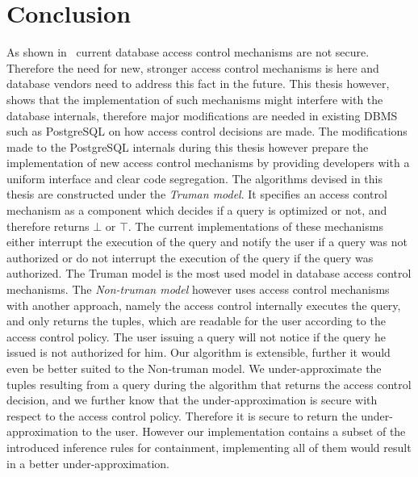 \section{Conclusion}

As shown in~\cite{guarnieri2016strong} current database access control mechanisms are not secure.
%
Therefore the need for new, stronger access control mechanisms is here and database vendors need to address this fact in the future.
%
This thesis however, shows that the implementation of such mechanisms might interfere with the database internals, therefore major modifications are needed in existing DBMS such as PostgreSQL on how access control decisions are made.
%
The modifications made to the PostgreSQL internals during this thesis however prepare the implementation of new access control mechanisms by providing developers with a uniform interface and clear code segregation.
%
The algorithms devised in this thesis are constructed under the \emph{Truman model}.
%
It specifies an access control mechanism as a component which decides if a query is optimized or not, and therefore returns $\bot$ or $\top$.
%
The current implementations of these mechanisms either interrupt the execution of the query and notify the user if a query was not authorized or do not interrupt the execution of the query if the query was authorized.
%
The Truman model is the most used model in database access control mechanisms.
%
The \emph{Non-truman model} however uses access control mechanisms with another approach, namely the access control internally executes the query, and only returns the tuples, which are readable for the user according to the access control policy.
%
The user issuing a query will not notice if the query he issued is not authorized for him.
%
Our algorithm is extensible, further it would even be better suited to the Non-truman model.
%
We under-approximate the tuples resulting from a query during the algorithm that returns the access control decision, and we further know that the under-approximation is secure with respect to the access control policy.
%
Therefore it is secure to return the under-approximation to the user.
%
However our implementation contains a subset of the introduced inference rules for containment, implementing all of them would result in a better under-approximation.
